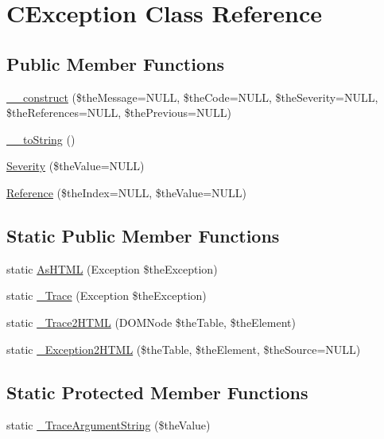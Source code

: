 \hypertarget{class_c_exception}{\section{C\-Exception Class Reference}
\label{class_c_exception}
}
\subsection*{Public Member Functions}
\begin{DoxyCompactItemize}
\item 
\hyperlink{class_c_exception_aea9f2ae76b6058652dfb672ce1a78507}{\-\_\-\-\_\-construct} (\$the\-Message=N\-U\-L\-L, \$the\-Code=N\-U\-L\-L, \$the\-Severity=N\-U\-L\-L, \$the\-References=N\-U\-L\-L, \$the\-Previous=N\-U\-L\-L)
\item 
\hyperlink{class_c_exception_a06b1b207799f8a8ca27bc12d1be82b07}{\-\_\-\-\_\-to\-String} ()
\item 
\hyperlink{class_c_exception_a2bef90da8a35e80dda8072d4f748ec20}{Severity} (\$the\-Value=N\-U\-L\-L)
\item 
\hyperlink{class_c_exception_abcbd46a262790fcbe3493e30a6418821}{Reference} (\$the\-Index=N\-U\-L\-L, \$the\-Value=N\-U\-L\-L)
\end{DoxyCompactItemize}
\subsection*{Static Public Member Functions}
\begin{DoxyCompactItemize}
\item 
static \hyperlink{class_c_exception_a99be238dee92094374995eebe54df6a8}{As\-H\-T\-M\-L} (Exception \$the\-Exception)
\item 
static \hyperlink{class_c_exception_ad5f92d9c5d11443ce4b69aec6a8484d5}{\-\_\-\-Trace} (Exception \$the\-Exception)
\item 
static \hyperlink{class_c_exception_a643b0ad0d3d4faba071968c953d639af}{\-\_\-\-Trace2\-H\-T\-M\-L} (D\-O\-M\-Node \$the\-Table, \$the\-Element)
\item 
static \hyperlink{class_c_exception_a84a97fbcc2907c16a29a01adf841ee94}{\-\_\-\-Exception2\-H\-T\-M\-L} (\$the\-Table, \$the\-Element, \$the\-Source=N\-U\-L\-L)
\end{DoxyCompactItemize}
\subsection*{Static Protected Member Functions}
\begin{DoxyCompactItemize}
\item 
static \hyperlink{class_c_exception_a84f7c3fe4e048f28881432a1fc138ffc}{\-\_\-\-Trace\-Argument\-String} (\$the\-Value)
\end{DoxyCompactItemize}
